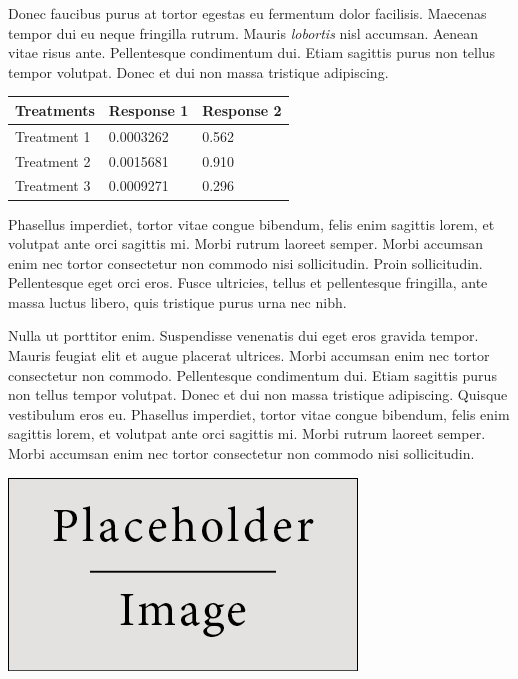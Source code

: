 \documentclass[a0,landscape]{a0poster}
\begin{document}
\begin{multicols}{4}
Donec faucibus purus at tortor egestas eu fermentum dolor facilisis. Maecenas tempor dui eu neque fringilla rutrum. Mauris \emph{lobortis} nisl accumsan. Aenean vitae risus ante. Pellentesque condimentum dui. Etiam sagittis purus non tellus tempor volutpat. Donec et dui non massa tristique adipiscing.
%
\begin{table} %
\begin{tabular}{l l l}
\toprule
\textbf{Treatments} & \textbf{Response 1} & \textbf{Response 2}\\
\midrule
Treatment 1 & 0.0003262 & 0.562 \\
Treatment 2 & 0.0015681 & 0.910 \\
Treatment 3 & 0.0009271 & 0.296 \\
\bottomrule
\end{tabular}
\end{table}
%
Phasellus imperdiet, tortor vitae congue bibendum, felis enim sagittis lorem, et volutpat ante orci sagittis mi. Morbi rutrum laoreet semper. Morbi accumsan enim nec tortor consectetur non commodo nisi sollicitudin. Proin sollicitudin. Pellentesque eget orci eros. Fusce ultricies, tellus et pellentesque fringilla, ante massa luctus libero, quis tristique purus urna nec nibh.

Nulla ut porttitor enim. Suspendisse venenatis dui eget eros gravida tempor. Mauris feugiat elit et augue placerat ultrices. Morbi accumsan enim nec tortor consectetur non commodo. Pellentesque condimentum dui. Etiam sagittis purus non tellus tempor volutpat. Donec et dui non massa tristique adipiscing. Quisque vestibulum eros eu. Phasellus imperdiet, tortor vitae congue bibendum, felis enim sagittis lorem, et volutpat ante orci sagittis mi. Morbi rutrum laoreet semper. Morbi accumsan enim nec tortor consectetur non commodo nisi sollicitudin.

\begin{center}\vspace{1cm}
\includegraphics[width=0.8\linewidth]{placeholder}
\end{center}\vspace{1cm}


\end{multicols}
\end{document}
